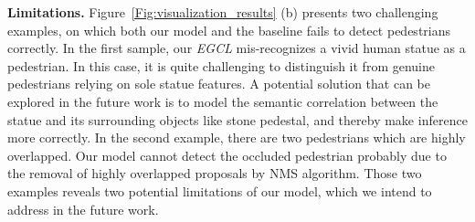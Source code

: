 \documentclass[journal]{IEEEtran}
\begin{document}
\noindent\textbf{Limitations.} Figure~\ref{Fig:visualization_results} (b) presents two challenging examples, on which both our model and the baseline fails to detect pedestrians correctly. In the first sample, our \emph{EGCL} mis-recognizes a vivid human statue as a pedestrian. In this case, it is quite challenging to distinguish it from genuine pedestrians relying on sole statue features. A potential solution that can be explored in the future work is to model the semantic correlation between the statue and its surrounding objects like stone pedestal, and thereby make inference more correctly. In the second example, there are two pedestrians which are highly overlapped. Our model cannot detect the occluded pedestrian probably due to the removal of highly overlapped proposals by NMS algorithm. Those two examples reveals two potential limitations of our model, which we intend to address in the future work.
\end{document}
